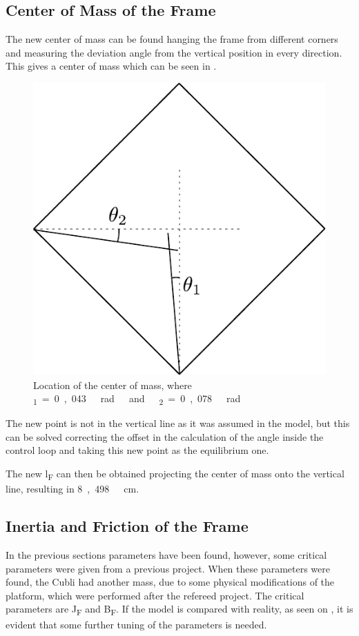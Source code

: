 \subsection{Center of Mass of the Frame}
The new center of mass can be found hanging the frame from different corners and measuring the deviation angle from the vertical position in every direction. This gives a center of mass which can be seen in . 
\begin{figure}[H]
	\centering
	\includegraphics[scale=0.6]{figures/centerOfMassDiagram}
	\caption{Location of the center of mass, where \si{\theta_1=0,043\ rad\ and\ \theta_2=0,078\ rad}}
	\label{centerOfMassDiagram}
\end{figure}


The new point is not in the vertical line as it was assumed in the model, but this can be solved correcting the offset in the calculation of the angle inside the control loop and taking this new point as the equilibrium one. 

The new \si{l_F} can then be obtained projecting the center of mass onto the vertical line, resulting in \si{8,498\ cm}.

\subsection{Inertia and Friction of the Frame}
In the previous sections parameters have been found, however, some critical parameters were given from a previous project. When these parameters were found, the Cubli had another mass, due to some physical modifications of the platform, which were performed after the refereed project. The critical parameters are \si{J_F} and \si{B_F}. If the model is compared with reality, as seen on , it is evident that some further tuning of the parameters is needed.

